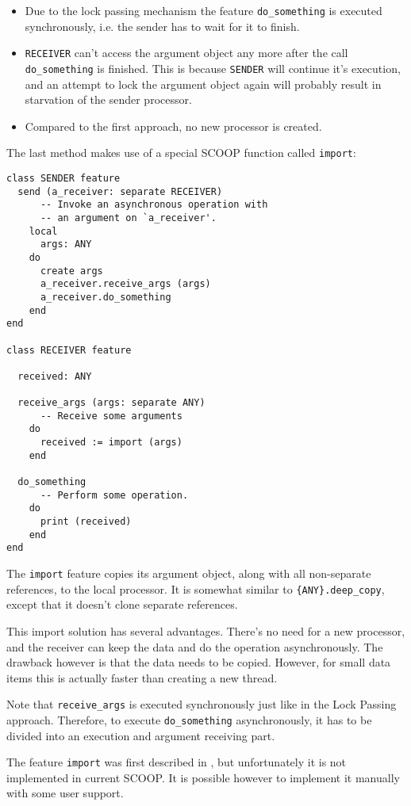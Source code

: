 \documentclass[a4paper,10pt]{article}
\begin{document}
\begin{itemize}
 \item Due to the lock passing mechanism  the feature \lstinline!do_something! is executed synchronously, i.e. the sender has to wait for it to finish.
 \item \lstinline!RECEIVER! can't access the argument object any more after the call \lstinline!do_something! is finished.
 This is because \lstinline!SENDER! will continue it's execution, and an attempt to lock the argument object again will probably result in starvation of the sender processor.
 \item Compared to the first approach, no new processor is created.
\end{itemize}

The last method makes use of a special SCOOP function called \lstinline!import!:
\begin{lstlisting}
class SENDER feature
  send (a_receiver: separate RECEIVER)
      -- Invoke an asynchronous operation with
      -- an argument on `a_receiver'.
    local
      args: ANY
    do
      create args
      a_receiver.receive_args (args)
      a_receiver.do_something
    end
end

class RECEIVER feature
  
  received: ANY
  
  receive_args (args: separate ANY)
      -- Receive some arguments
    do
      received := import (args)
    end

  do_something
      -- Perform some operation.
    do
      print (received)
    end
end
\end{lstlisting}
The \lstinline!import! feature copies its argument object, along with all non-separate references, to the local processor.
It is somewhat similar to \lstinline!{ANY}.deep_copy!, except that it doesn't clone separate references.

This import solution has several advantages.
There's no need for a new processor, and the receiver can keep the data and do the operation asynchronously.
The drawback however is that the data needs to be copied.
However, for small data items this is actually faster than creating a new thread.

Note that \lstinline!receive_args! is executed synchronously just like in the Lock Passing approach.
Therefore, to execute \lstinline!do_something! asynchronously, it has to be divided into an execution and argument receiving part.

The feature \lstinline!import! was first described in , but unfortunately it is not implemented in current SCOOP.
It is possible however to implement it manually with some user support.
\end{document}
